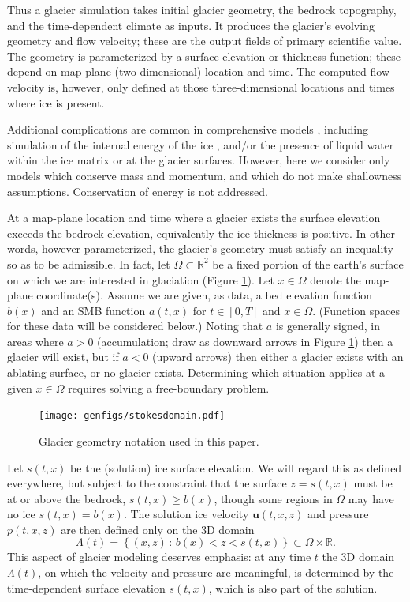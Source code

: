 \documentclass[hidelinks,onefignum,onetabnum,final]{siamart220329}  %
\newcommand{\RR}{\mathbb{R}}
\newcommand{\bu}{\mathbf{u}}
\begin{document}
Thus a glacier simulation takes initial glacier geometry, the bedrock topography, and the time-dependent climate as inputs.  It produces the glacier's evolving geometry and flow velocity; these are the output fields of primary scientific value.  The geometry is parameterized by a surface elevation or thickness function; these depend on map-plane (two-dimensional) location and time.  The computed flow velocity is, however, only defined at those three-dimensional locations and times where ice is present.

Additional complications are common in comprehensive models \cite{GreveBlatter2009}, including simulation of the internal energy of the ice \cite{Aschwandenetal2012}, and/or the presence of liquid water within the ice matrix or at the glacier surfaces.  However, here we consider only models which conserve mass and momentum, and which do not make shallowness assumptions.  Conservation of energy is not addressed.

At a map-plane location and time where a glacier exists the surface elevation exceeds the bedrock elevation, equivalently the ice thickness is positive.  In other words, however parameterized, the glacier's geometry must satisfy an inequality so as to be admissible.  In fact, let $\Omega \subset \RR^2$ be a fixed portion of the earth's surface on which we are interested in glaciation (Figure \ref{fig:stokesdomain}).  Let $x\in\Omega$ denote the map-plane coordinate(s).  Assume we are given, as data, a bed elevation function $b(x)$ and an SMB function $a(t,x)$ for $t\in [0,T]$ and $x\in \Omega$.  (Function spaces for these data will be considered below.)  Noting that $a$ is generally signed, in areas where $a>0$ (accumulation; draw as downward arrows in Figure \ref{fig:stokesdomain}) then a glacier will exist, but if $a<0$ (upward arrows) then either a glacier exists with an ablating surface, or no glacier exists.  Determining which situation applies at a given $x\in\Omega$ requires solving a free-boundary problem.

\medskip
\begin{figure}[ht]
\centering
\texttt{[image: genfigs/stokesdomain.pdf]}
\caption{Glacier geometry notation used in this paper.}
\label{fig:stokesdomain}
\end{figure}

\medskip
Let $s(t,x)$ be the (solution) ice surface elevation.  We will regard this as defined everywhere, but subject to the constraint that the surface $z=s(t,x)$ must be at or above the bedrock, $s(t,x) \ge b(x)$, though some regions in $\Omega$ may have no ice $s(t,x)=b(x)$.  The solution ice velocity $\bu(t,x,z)$ and pressure $p(t,x,z)$ are then defined only on the 3D domain
\begin{equation}
\Lambda(t) = \left\{(x,z)\,:\,b(x) < z < s(t,x)\right\} \subset \Omega \times \RR. \label{eq:icydomain}
\end{equation}
This aspect of glacier modeling deserves emphasis: at any time $t$ the 3D domain $\Lambda(t)$, on which the velocity and pressure are meaningful, is determined by the time-dependent surface elevation $s(t,x)$, which is also part of the solution.
\end{document}
